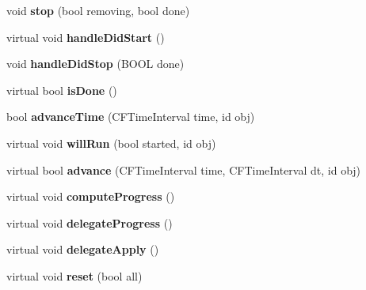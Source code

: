 \begin{DoxyCompactItemize}
void {\bfseries stop} (bool removing, bool done)
\item 
\mbox{\label{struct___p_o_p_animation_state_a0de061282ce85f8ea81380ee55bbbbb7}} 
virtual void {\bfseries handle\+Did\+Start} ()
\item 
\mbox{\label{struct___p_o_p_animation_state_aff39701a5607d7cbaa045837ee10b050}} 
void {\bfseries handle\+Did\+Stop} (B\+O\+OL done)
\item 
\mbox{\label{struct___p_o_p_animation_state_ac4f667741a5a437de04918389b3b6a5b}} 
virtual bool {\bfseries is\+Done} ()
\item 
\mbox{\label{struct___p_o_p_animation_state_ad31f99b08242fd61384a98b36e6c5c99}} 
bool {\bfseries advance\+Time} (C\+F\+Time\+Interval time, id obj)
\item 
\mbox{\label{struct___p_o_p_animation_state_aa326848321f16cb0de62809e167d1ccc}} 
virtual void {\bfseries will\+Run} (bool started, id obj)
\item 
\mbox{\label{struct___p_o_p_animation_state_a8a908ccc43dc91b93a4370d6c79810a9}} 
virtual bool {\bfseries advance} (C\+F\+Time\+Interval time, C\+F\+Time\+Interval dt, id obj)
\item 
\mbox{\label{struct___p_o_p_animation_state_af0028cdf0e286fb98017e4730846fb14}} 
virtual void {\bfseries compute\+Progress} ()
\item 
\mbox{\label{struct___p_o_p_animation_state_a2fdf3bf5e42664f42304b791ab8819fe}} 
virtual void {\bfseries delegate\+Progress} ()
\item 
\mbox{\label{struct___p_o_p_animation_state_aca20c7adc6409f58b7d4fbc128b0283d}} 
virtual void {\bfseries delegate\+Apply} ()
\item 
\mbox{\label{struct___p_o_p_animation_state_a7b4acd646f8e97c1e07c906c04e36d94}} 
virtual void {\bfseries reset} (bool all)
\end{DoxyCompactItemize}
